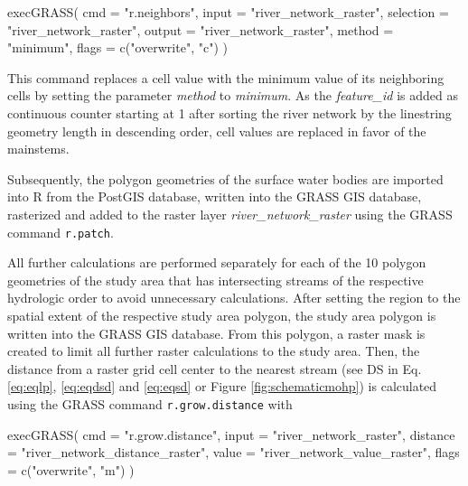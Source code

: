\documentclass[fleqn,10pt]{wlscirep}
\newenvironment{Shaded}{\begin{snugshade}}{\end{snugshade}}
\newcommand{\AttributeTok}[1]{\textcolor[rgb]{0.77,0.63,0.00}{#1}}
\newcommand{\FunctionTok}[1]{\textcolor[rgb]{0.00,0.00,0.00}{#1}}
\newcommand{\NormalTok}[1]{#1}
\newcommand{\StringTok}[1]{\textcolor[rgb]{0.31,0.60,0.02}{#1}}
\begin{document}
\small

\begin{Shaded}
\begin{Highlighting}[]
\FunctionTok{execGRASS}\NormalTok{(}
  \AttributeTok{cmd =} \StringTok{"r.neighbors"}\NormalTok{,}
  \AttributeTok{input =} \StringTok{"river\_network\_raster"}\NormalTok{,}
  \AttributeTok{selection =} \StringTok{"river\_network\_raster"}\NormalTok{,}
  \AttributeTok{output =} \StringTok{"river\_network\_raster"}\NormalTok{,}
  \AttributeTok{method =} \StringTok{"minimum"}\NormalTok{,}
  \AttributeTok{flags =} \FunctionTok{c}\NormalTok{(}\StringTok{"overwrite"}\NormalTok{, }\StringTok{"c"}\NormalTok{)}
\NormalTok{)}
\end{Highlighting}
\end{Shaded}

\normalsize

This command replaces a cell value with the minimum value of its neighboring cells by setting the parameter \emph{method} to \emph{minimum}. As the \emph{feature\_id} is added as continuous counter starting at 1 after sorting the river network by the linestring geometry length in descending order, cell values are replaced in favor of the mainstems.

Subsequently, the polygon geometries of the surface water bodies are imported into R from the PostGIS database, written into the GRASS GIS database, rasterized and added to the raster layer \emph{river\_network\_raster} using the GRASS command \texttt{r.patch}.

All further calculations are performed separately for each of the 10 polygon geometries of the study area that has intersecting streams of the respective hydrologic order to avoid unnecessary calculations. After setting the region to the spatial extent of the respective study area polygon, the study area polygon is written into the GRASS GIS database. From this polygon, a raster mask is created to limit all further raster calculations to the study area.
Then, the distance from a raster grid cell center to the nearest stream (see DS in Eq. \eqref{eq:eqlp}, \eqref{eq:eqdsd} and \eqref{eq:eqsd} or Figure \ref{fig:schematicmohp}) is calculated using the GRASS command \texttt{r.grow.distance} with

\small

\begin{Shaded}
\begin{Highlighting}[]
\FunctionTok{execGRASS}\NormalTok{(}
  \AttributeTok{cmd =} \StringTok{"r.grow.distance"}\NormalTok{,}
  \AttributeTok{input =} \StringTok{"river\_network\_raster"}\NormalTok{,}
  \AttributeTok{distance =} \StringTok{"river\_network\_distance\_raster"}\NormalTok{,}
  \AttributeTok{value =} \StringTok{"river\_network\_value\_raster"}\NormalTok{,}
  \AttributeTok{flags =} \FunctionTok{c}\NormalTok{(}\StringTok{"overwrite"}\NormalTok{, }\StringTok{"m"}\NormalTok{)}
\NormalTok{)}
\end{Highlighting}
\end{Shaded}
\end{document}
